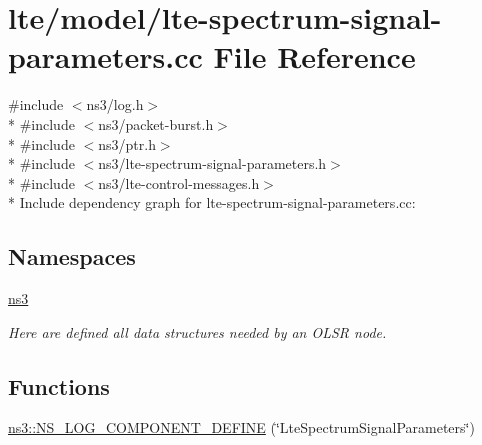 \hypertarget{lte-spectrum-signal-parameters_8cc}{}\section{lte/model/lte-\/spectrum-\/signal-\/parameters.cc File Reference}
\label{lte-spectrum-signal-parameters_8cc}
{\ttfamily \#include $<$ns3/log.\+h$>$}\\*
{\ttfamily \#include $<$ns3/packet-\/burst.\+h$>$}\\*
{\ttfamily \#include $<$ns3/ptr.\+h$>$}\\*
{\ttfamily \#include $<$ns3/lte-\/spectrum-\/signal-\/parameters.\+h$>$}\\*
{\ttfamily \#include $<$ns3/lte-\/control-\/messages.\+h$>$}\\*
Include dependency graph for lte-\/spectrum-\/signal-\/parameters.cc\+:
\subsection*{Namespaces}
\begin{DoxyCompactItemize}
\item 
 \hyperlink{namespacens3}{ns3}
\begin{DoxyCompactList}\small\item\em Here are defined all data structures needed by an O\+L\+SR node. \end{DoxyCompactList}\end{DoxyCompactItemize}
\subsection*{Functions}
\begin{DoxyCompactItemize}
\item 
\hyperlink{namespacens3_a55b7ce1829eb29ed7d3563ae023ae684}{ns3\+::\+N\+S\+\_\+\+L\+O\+G\+\_\+\+C\+O\+M\+P\+O\+N\+E\+N\+T\+\_\+\+D\+E\+F\+I\+NE} (\char`\"{}Lte\+Spectrum\+Signal\+Parameters\char`\"{})
\end{DoxyCompactItemize}
